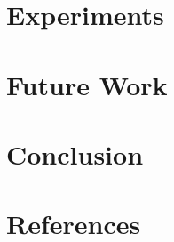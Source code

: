 \documentclass{article}
\begin{document}
\begin{multicols}{2}



\section{Experiments}
\section{Future Work}
\section{Conclusion}
\section{References}


\end{multicols}
\end{document}
